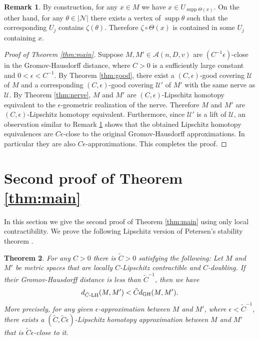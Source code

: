 \documentclass[a4paper,12pt]{amsart}
\theoremstyle{plain}
\newtheorem{thm}{Theorem}
\theoremstyle{definition}
\newtheorem{rem}[thm]{Remark}
\numberwithin{thm}{section}
\numberwithin{equation}{section}
\DeclareMathOperator{\supp}{supp}
\begin{document}
\begin{rem}\label{rem:nerve}
By construction, for any $x\in M$ we have $x\in U_{\supp\Theta(x)}$.
On the other hand, for any $\theta\in|\mathcal N|$ there exists a vertex of $\supp\theta$ such that the corresponding $U_j$ contains $\zeta(\theta)$.
Therefore $\zeta\circ\Theta(x)$ is contained in some $U_j$ containing $x$.
\end{rem}

\begin{proof}[Proof of Theorem \ref{thm:main}]
Suppose $M,M'\in\mathcal A(n,D,v)$ are $(C^{-1}\epsilon)$-close in the Gromov-Hausdorff distance, where $C>0$ is a sufficiently large constant and $0<\epsilon<C^{-1}$.
By Theorem \ref{thm:good}, there exist a $(C,\epsilon)$-good covering $\mathcal U$ of $M$ and a corresponding $(C,\epsilon)$-good covering $\mathcal U'$ of $M'$ with the same nerve as $\mathcal U$.
By Theorem \ref{thm:nerve}, $M$ and $M'$ are $(C,\epsilon)$-Lipschitz homotopy equivalent to the $\epsilon$-geometric realization of the nerve.
Therefore $M$ and $M'$ are $(C,\epsilon)$-Lipschitz homotopy equivalent.
Furthermore, since $\mathcal U'$ is a lift of $\mathcal U$, an observation similar to Remark \ref{rem:nerve} shows that the obtained Lipschitz homotopy equivalences are $C\epsilon$-close to the original Gromov-Hausdorff approximations.
In particular they are also $C\epsilon$-approximations.
This completes the proof.
\end{proof}

\section{Second proof of Theorem \ref{thm:main}}\label{sec:main2}

In this section we give the second proof of Theorem \ref{thm:main} using only local contractibility.
We prove the following Lipschitz version of Petersen's stability theorem \cite[Theorem A]{Peter}.

\begin{thm}\label{thm:Peter}
For any $C>0$ there is $\tilde C>0$ satisfying the following:
Let $M$ and $M'$ be metric spaces that are locally $C$-Lipschitz contractible and $C$-doubling.
If their Gromov-Hausdorff distance is less than $\tilde C^{-1}$, then we have
\[d_{\tilde C\mathchar`-\mathrm{LH}}(M,M')<\tilde Cd_\mathrm{GH}(M,M').\]
More precisely, for any given $\epsilon$-approximation between $M$ and $M'$, where $\epsilon<\tilde C^{-1}$, there exists a $(\tilde C,\tilde C\epsilon)$-Lipschitz homotopy approximation between $M$ and $M'$ that is $\tilde C\epsilon$-close to it.
\end{thm}
\end{document}
